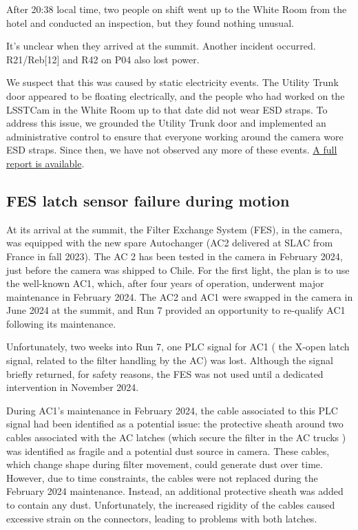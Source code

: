 After 20:38 local time, two people on shift went up to the White Room from the hotel and conducted an inspection, but they found nothing unusual.

It's unclear when they arrived at the summit. Another incident occurred. R21/Reb[12] and R42 on P04 also lost power.

We suspect that this was caused by static electricity events. The Utility Trunk door appeared to be floating electrically, and the people who had worked on the LSSTCam in the White Room up to that date did not wear ESD straps. To address this issue, we grounded the Utility Trunk door and implemented an administrative control to ensure that everyone working around the camera wore ESD straps. Since then, we have not observed any more of these events.
\href{https://rubinobs.atlassian.net/wiki/spaces/CAM/pages/69763079/REB+trip+off+issue+08+29+24}{A full report is available}.

\clearpage
\subsection{FES latch sensor failure during motion}\label{sec:feslatchissue}
At its arrival at the summit, the Filter Exchange System (FES), in the camera, was equipped with the new spare Autochanger (AC2 delivered at SLAC from France in fall 2023). The AC 2 has been tested in the camera in February 2024, just before the camera was shipped to Chile. For the first light, the plan is to use the well-known AC1, which, after four years of operation, underwent major maintenance in February 2024. The AC2 and AC1 were swapped in the camera in June 2024 at the summit, and Run 7 provided an opportunity to re-qualify AC1 following its maintenance.


Unfortunately, two weeks into Run 7, one PLC signal for AC1 ( the X-open latch signal, related to the filter handling by the AC) was lost. Although the signal briefly returned, for safety reasons, the FES was not used until a dedicated intervention in November 2024.

During AC1’s maintenance in February 2024, the cable associated to this PLC signal had  been identified as a potential issue:  the protective sheath around two cables associated with the AC latches (which secure the filter in the AC trucks ) was identified as fragile and a potential dust source in camera. These cables, which change shape during filter movement, could generate dust over time. However, due to time constraints, the cables were not replaced during the February 2024 maintenance. Instead, an additional protective sheath was added to contain any dust. Unfortunately, the increased rigidity of the cables caused excessive strain on the connectors, leading to problems with both latches.


